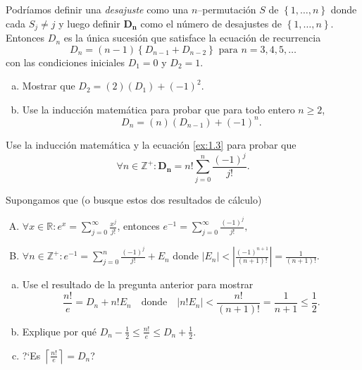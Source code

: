 \begin{solution}
	
\end{solution}

\begin{exercise}
Podríamos definir una \emph{desajuste} como una $n$--permutación $S$ de $\left\{1,\ldots,n\right\}$ donde cada $S_{j}\neq j$ y luego definir $\bm{D_n}$ como el número de desajustes de $\left\{1,\ldots,n\right\}$. Entonces $D_{n}$ es la única sucesión que satisface la ecuación de recurrencia
\begin{equation}\label{ex:1.3}
D_{n}=\left(n-1\right)\left\{D_{n-1}+D_{n-2}\right\}\text{ para }n=3,4,5,\ldots
\end{equation}
con las condiciones iniciales $D_{1}=0$ y $D_{2}=1$.
\begin{enumerate}[(a)]
	\item Mostrar que $D_{2}=(2)\left(D_{1}\right)+(-1)^2$.
	\item Use la inducción matemática para probar que para todo entero $n\geq2$, \[ D_{n}=(n)(D_{n-1})+{(-1)}^n. \]
\end{enumerate}
\end{exercise}

\begin{solution}

\end{solution}

\begin{exercise}
Use la inducción matemática y la ecuación \eqref{ex:1.3} para probar que \[ \forall n\in\mathds{Z}^{+}\colon\bm{D_n}=n!\sum_{j=0}^n\frac{(-1)^j}{j!}. \]
\end{exercise}

\begin{solution}
	
\end{solution}

\begin{exercise}
Supongamos que (o busque estos dos resultados de cálculo)
\begin{enumerate}[A.]
	\item $\forall x\in\mathds{R}\colon e^x=\sum_{j=0}^\infty\frac{x^j}{j!}$, entonces $e^{-1}=\sum_{j=0}^\infty\frac{(-1)^j}{j!},$
	\item $\forall n\in\mathds{Z}^{+}\colon e^{-1}=\sum_{j=0}^n\frac{(-1)^j}{j!}+E_n$ donde $|E_n|<\left|\frac{(-1)^{n+1}}{(n+1)!}\right|=\frac{1}{(n+1)!}$.
\end{enumerate}

\begin{enumerate}[(a)]
	\item Use el resultado de la pregunta anterior para mostrar \[ \frac{n!}{e}=D_{n}+n!E_{n}\quad\text{donde}\quad|n!E_n|<\frac{n!}{(n+1)!}=\frac{1}{n+1}\leq\frac{1}{2}. \]
	\item Explique por qué $D_{n}-\frac{1}{2}\leq\frac{n!}{e}\leq D_{n}+\frac{1}{2}$.
	\item ?`Es $\left\lceil\frac{n!}{e}\right\rceil=D_{n}$?
\end{enumerate}

\end{exercise}

